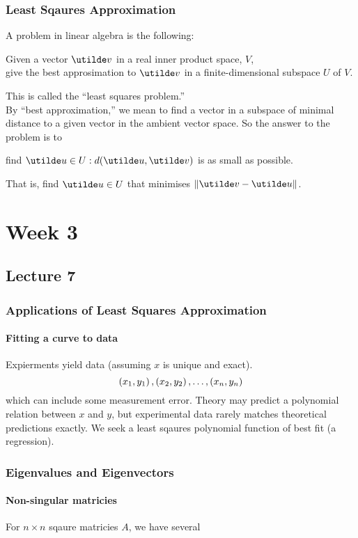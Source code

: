 \documentclass{report}
\begin{document}
\subsection{Least Sqaures Approximation}
A problem in linear algebra is the following:
\begin{center}
  Given a vector $\ut{v}$ in a real inner product space, $V$,\\ give the best approsimation to $\ut{v}$ in a finite-dimensional subspace $U$ of $V$.
\end{center}
This is called the ``least squares problem.'' \\
By ``best approximation,'' we mean to find a vector in a subspace of minimal distance to a given vector in the ambient vector space. So the answer to the problem is to 
\begin{center}
  find $\ut{u}\in U: d(\ut{u},\ut{v})$ is as small as possible.
\end{center}
That is, find $\ut{u}\in U$ that minimises $\norm{\ut{v}-\ut{u}}$.


\chapter{Week 3}
\section{Lecture 7}
\subsection{Applications of Least Squares Approximation}
\subsubsection{Fitting a curve to data}
Expierments yield data (assuming $x$ is unique and exact).
$$
  \left( x_1,y_1 \right), \left( x_2,y_2 \right),\dots, \left( x_n,y_n \right)
$$
which can include some measurement error. Theory may predict a polynomial relation between $x$ and $y$, but experimental data rarely matches theoretical predictions exactly. We seek a least sqaures polynomial function of best fit (a regression).

\subsection{Eigenvalues and Eigenvectors}
\subsubsection{Non-singular matricies}
For $n\times n$ sqaure matricies $A$, we have several 
\end{document}
